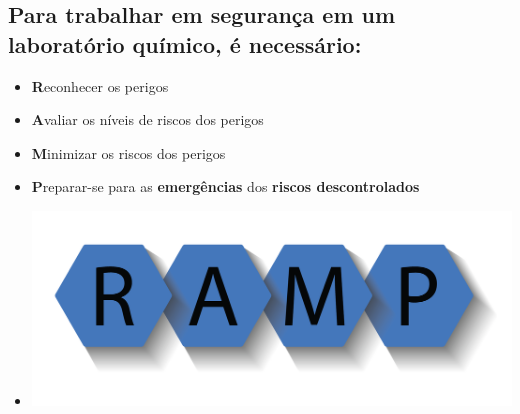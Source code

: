 \documentclass[
  letterpaper,
  DIV=11,
  numbers=noendperiod]{scrartcl}
\providecommand{\tightlist}{%
  \setlength{\itemsep}{0pt}\setlength{\parskip}{0pt}}\usepackage{longtable,booktabs,array}
\begin{document}
\subsection{Para trabalhar em segurança em um laboratório químico, é
necessário:}\label{para-trabalhar-em-seguranuxe7a-em-um-laboratuxf3rio-quuxedmico-uxe9-necessuxe1rio}

\begin{itemize}
\tightlist
\item
  \textbf{R}econhecer os perigos
\end{itemize}

\begin{itemize}
\tightlist
\item
  \textbf{A}valiar os níveis de riscos dos perigos
\end{itemize}

\begin{itemize}
\tightlist
\item
  \textbf{M}inimizar os riscos dos perigos
\end{itemize}

\begin{itemize}
\tightlist
\item
  \textbf{P}reparar-se para as \textbf{emergências} dos \textbf{riscos
  descontrolados}
\end{itemize}

\begin{itemize}
\tightlist
\item
  \includegraphics[width=6.25in,height=\textheight,keepaspectratio]{imagens/RAMP.png}
\end{itemize}
\end{document}
